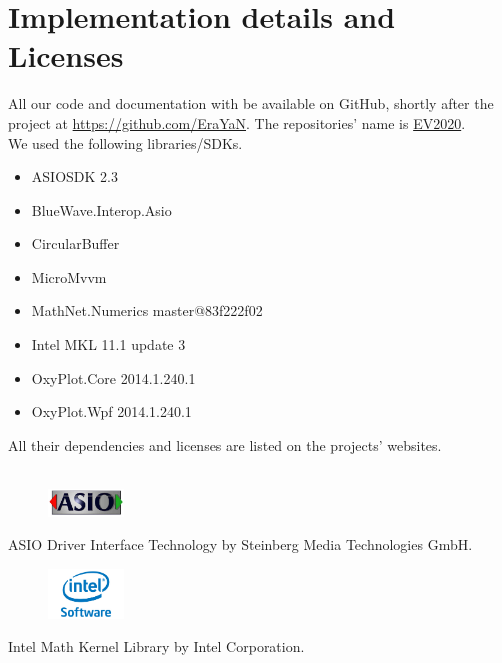 \documentclass[final]{scrreprt} %
\begin{document}
\section{Implementation details and Licenses}
All our code and documentation with be available on GitHub, shortly after the project at \href{https://github.com/EraYaN}{https://github.com/EraYaN}. The repositories' name is \href{https://github.com/EraYaN/EV2020}{EV2020}.\\

We used the following libraries/SDKs.
\begin{itemize}
\item ASIOSDK 2.3
\item BlueWave.Interop.Asio
\item CircularBuffer
\item MicroMvvm
\item MathNet.Numerics master@83f222f02
\item Intel MKL 11.1 update 3
\item OxyPlot.Core 2014.1.240.1
\item OxyPlot.Wpf 2014.1.240.1
\end{itemize}
All their dependencies and licenses are listed on the projects' websites.
\\ \\
\begin{figure}[h]
	\includegraphics[width=2cm]{resources/ASIO_LOGO1.jpg}
\end{figure}
ASIO Driver Interface Technology by Steinberg Media Technologies GmbH.\\
\begin{figure}[h]
	\includegraphics[width=2cm]{resources/intel-logo.jpg}
\end{figure}
Intel Math Kernel Library by Intel Corporation.
\end{document}
